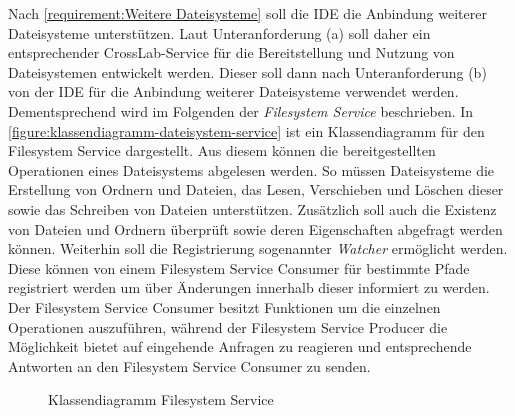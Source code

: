 Nach \autoref{requirement:Weitere Dateisysteme} soll die IDE die Anbindung weiterer Dateisysteme unterstützen. Laut Unteranforderung (a) soll daher ein entsprechender CrossLab-Service für die Bereitstellung und Nutzung von Dateisystemen entwickelt werden. Dieser soll dann nach Unteranforderung (b) von der IDE für die Anbindung weiterer Dateisysteme verwendet werden. Dementsprechend wird im Folgenden der \textit{Filesystem Service} beschrieben. In \autoref{figure:klassendiagramm-dateisystem-service} ist ein Klassendiagramm für den Filesystem Service dargestellt. Aus diesem können die bereitgestellten Operationen eines Dateisystems abgelesen werden. So müssen Dateisysteme die Erstellung von Ordnern und Dateien, das Lesen, Verschieben und Löschen dieser sowie das Schreiben von Dateien unterstützen. Zusätzlich soll auch die Existenz von Dateien und Ordnern überprüft sowie deren Eigenschaften abgefragt werden können. Weiterhin soll die Registrierung sogenannter \textit{Watcher} ermöglicht werden. Diese können von einem Filesystem Service Consumer für bestimmte Pfade registriert werden um über Änderungen innerhalb dieser informiert zu werden. Der Filesystem Service Consumer besitzt Funktionen um die einzelnen Operationen auszuführen, während der Filesystem Service Producer die Möglichkeit bietet auf eingehende Anfragen zu reagieren und entsprechende Antworten an den Filesystem Service Consumer zu senden.

\begin{figure}[tbp]
    \centering
    \caption{Klassendiagramm Filesystem Service}
    \label{figure:klassendiagramm-dateisystem-service}
\end{figure}

